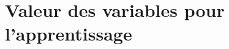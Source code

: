 \chapter{Valeur des variables pour l'apprentissage} %
\label{cha:Valeur des variables pour l'apprentissage}

